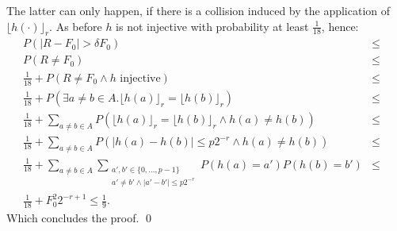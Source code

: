 \documentclass[11pt,a4paper]{article}
\newcommand{\size}[1]{\lvert#1\rvert}
\begin{document}
The latter can only happen, if there is a collision induced by the application of $\lfloor h(\cdot)\rfloor_r$. As before $h$ is not injective with probability at least $\frac{1}{18}$, hence:
\begin{eqnarray*}
    P\left( \size{R - F_0} > \delta F_0\right) & \leq & \\
    P\left( R \neq F_0 \right) & \leq & \\
    \frac{1}{18} + P\left( R \neq F_0 \wedge h \textrm{ injective} \right) & \leq & \\
    \frac{1}{18} + P\left( \exists a \neq b \in A. \lfloor h(a) \rfloor_r = \lfloor h(b) \rfloor_r  \right) & \leq & \\
    \frac{1}{18} + \sum_{a \neq b \in A} P\left(\lfloor h(a) \rfloor_r = \lfloor h(b) \rfloor_r \wedge h(a) \neq h(b) \right) & \leq & \\
    \frac{1}{18} + \sum_{a \neq b \in A} P\left(\size{h(a) - h(b)} \leq p 2^{-r} \wedge h(a) \neq h(b) \right) & \leq & \\
    \frac{1}{18} + \sum_{a \neq b \in A} \sum_{\substack{a', b' \in \{0,\ldots, p-1\} \\  a' \neq b' \wedge \size{a'-b'} \leq p 2^{-r}}} P(h(a) = a') P(h(b)= b') & \leq & \\
    \frac{1}{18} + F_0^2 2^{-r+1} \leq \frac{1}{9} \textrm{.}
\end{eqnarray*}
Which concludes the proof. \qed


\end{document}
